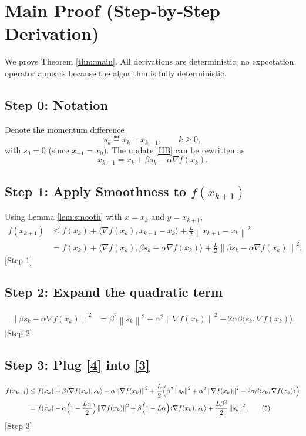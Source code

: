 \documentclass{article}
\newcommand{\norm}[1]{\left\lVert#1\right\rVert}
\begin{document}
\section*{Main Proof (Step‑by‑Step Derivation)}
We prove Theorem \ref{thm:main}.  All derivations are deterministic; no expectation operator appears because the algorithm is fully deterministic.

\subsection*{Step 0: Notation}
Denote the momentum difference
\[
s_{k}\eqdef x_{k}-x_{k-1},\qquad k\ge0,
\]
with $s_{0}=0$ (since $x_{-1}=x_{0}$).  The update \eqref{HB} can be rewritten as
\begin{equation}
x_{k+1}=x_{k}+\beta s_{k}-\alpha\nabla f(x_{k}). \tag{2}
\end{equation}

\subsection*{Step 1: Apply Smoothness to $f(x_{k+1})$}
Using Lemma \ref{lem:smooth} with $x=x_{k}$ and $y=x_{k+1}$,
\begin{align}
f(x_{k+1}) 
&\le f(x_{k})+\langle\nabla f(x_{k}),x_{k+1}-x_{k}\rangle+\frac{L}{2}\norm{x_{k+1}-x_{k}}^{2} \nonumber\\
&= f(x_{k})+\langle\nabla f(x_{k}),\beta s_{k}-\alpha\nabla f(x_{k})\rangle
      +\frac{L}{2}\norm{\beta s_{k}-\alpha\nabla f(x_{k})}^{2}. \tag{3}
\end{align}
\underline{[Step 1]}

\subsection*{Step 2: Expand the quadratic term}
\begin{align}
\norm{\beta s_{k}-\alpha\nabla f(x_{k})}^{2}
&= \beta^{2}\norm{s_{k}}^{2}+\alpha^{2}\norm{\nabla f(x_{k})}^{2}
   -2\alpha\beta\langle s_{k},\nabla f(x_{k})\rangle . \tag{4}
\end{align}
\underline{[Step 2]}

\subsection*{Step 3: Plug \eqref{4} into \eqref{3}}
\begin{align}
f(x_{k+1}) 
&\le f(x_{k})
   +\beta\langle\nabla f(x_{k}),s_{k}\rangle
   -\alpha\norm{\nabla f(x_{k})}^{2}
   +\frac{L}{2}\Bigl(\beta^{2}\norm{s_{k}}^{2}
                     +\alpha^{2}\norm{\nabla f(x_{k})}^{2}
                     -2\alpha\beta\langle s_{k},\nabla f(x_{k})\rangle\Bigr) \nonumber\\
&= f(x_{k})
   -\alpha\Bigl(1-\frac{L\alpha}{2}\Bigr)\norm{\nabla f(x_{k})}^{2}
   +\beta\Bigl(1-L\alpha\Bigr)\langle\nabla f(x_{k}),s_{k}\rangle
   +\frac{L\beta^{2}}{2}\norm{s_{k}}^{2}. \tag{5}
\end{align}
\underline{[Step 3]}
\end{document}
